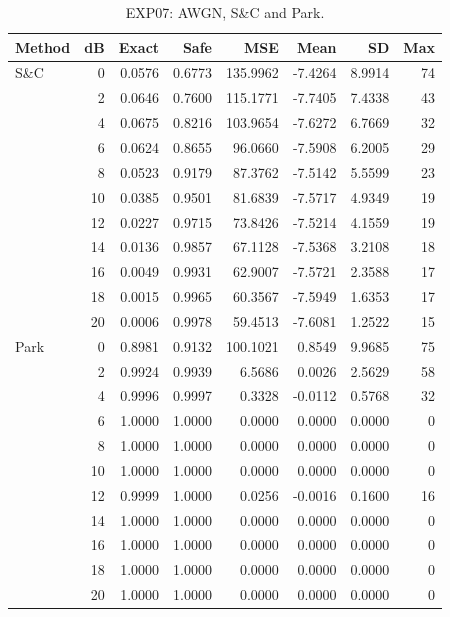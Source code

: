 \begin{table}[!p]
\centering
\caption{EXP07: AWGN, S\&C and Park.}
\label{app:exp07-0-0}
\small
\setlength{\tabcolsep}{3pt}
\renewcommand{\arraystretch}{1.05}
\begin{tabular}{lrrrrrrr}
\hline
Method & dB & Exact & Safe & MSE & Mean & SD & Max \\
\hline
S\&C & 0 & 0.0576 & 0.6773 & 135.9962 & -7.4264 & 8.9914 & 74 \\
 & 2 & 0.0646 & 0.7600 & 115.1771 & -7.7405 & 7.4338 & 43 \\
 & 4 & 0.0675 & 0.8216 & 103.9654 & -7.6272 & 6.7669 & 32 \\
 & 6 & 0.0624 & 0.8655 & 96.0660 & -7.5908 & 6.2005 & 29 \\
 & 8 & 0.0523 & 0.9179 & 87.3762 & -7.5142 & 5.5599 & 23 \\
 & 10 & 0.0385 & 0.9501 & 81.6839 & -7.5717 & 4.9349 & 19 \\
 & 12 & 0.0227 & 0.9715 & 73.8426 & -7.5214 & 4.1559 & 19 \\
 & 14 & 0.0136 & 0.9857 & 67.1128 & -7.5368 & 3.2108 & 18 \\
 & 16 & 0.0049 & 0.9931 & 62.9007 & -7.5721 & 2.3588 & 17 \\
 & 18 & 0.0015 & 0.9965 & 60.3567 & -7.5949 & 1.6353 & 17 \\
 & 20 & 0.0006 & 0.9978 & 59.4513 & -7.6081 & 1.2522 & 15 \\
\hline
Park & 0 & 0.8981 & 0.9132 & 100.1021 & 0.8549 & 9.9685 & 75 \\
 & 2 & 0.9924 & 0.9939 & 6.5686 & 0.0026 & 2.5629 & 58 \\
 & 4 & 0.9996 & 0.9997 & 0.3328 & -0.0112 & 0.5768 & 32 \\
 & 6 & 1.0000 & 1.0000 & 0.0000 & 0.0000 & 0.0000 & 0 \\
 & 8 & 1.0000 & 1.0000 & 0.0000 & 0.0000 & 0.0000 & 0 \\
 & 10 & 1.0000 & 1.0000 & 0.0000 & 0.0000 & 0.0000 & 0 \\
 & 12 & 0.9999 & 1.0000 & 0.0256 & -0.0016 & 0.1600 & 16 \\
 & 14 & 1.0000 & 1.0000 & 0.0000 & 0.0000 & 0.0000 & 0 \\
 & 16 & 1.0000 & 1.0000 & 0.0000 & 0.0000 & 0.0000 & 0 \\
 & 18 & 1.0000 & 1.0000 & 0.0000 & 0.0000 & 0.0000 & 0 \\
 & 20 & 1.0000 & 1.0000 & 0.0000 & 0.0000 & 0.0000 & 0 \\
\hline
\end{tabular}
\end{table}

